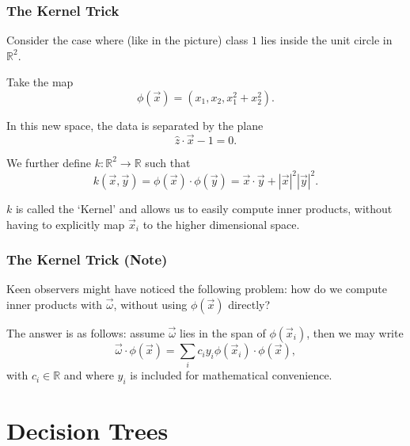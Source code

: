 \documentclass[mathserif,serif]{beamer}
\begin{document}
\begin{frame}
  \frametitle{The Kernel Trick}
  Consider the case where (like in the picture) class $1$ lies inside the unit circle in $\mathbb{R}^2$.

  \pause
  Take the map
  \begin{equation}
    \phi(\vec x) = (x_1, x_2, x_1^2+x_2^2).
  \end{equation}

  \pause
  In this new space, the data is separated by the plane
  \begin{equation}
    \hat z \cdot \vec x - 1 = 0.
  \end{equation}

  \pause
  We further define $k: \mathbb{R}^2 \to \mathbb{R}$ such that
  \begin{equation}
    k(\vec x, \vec y) = \phi(\vec x) \cdot \phi(\vec y) = \vec x \cdot \vec y + |\vec x|^2 |\vec y|^2.
  \end{equation}

  \pause
  $k$ is called the `Kernel' and allows us to easily compute inner products, without having to
  explicitly map $\vec x_i$ to the higher dimensional space.

\end{frame}

\begin{frame}
  \frametitle{The Kernel Trick (Note)}

  Keen observers might have noticed the following problem: how do we compute inner products with
  $\vec\omega$, without using $\phi(\vec x)$ directly?

  \pause
  The answer is as follows: assume $\vec\omega$ lies in the span of $\phi(\vec x_i)$, then we may
  write
  \begin{equation}
    \vec\omega \cdot \phi(\vec x) = \sum_i c_i y_i \phi(\vec x_i) \cdot \phi(\vec x),
  \end{equation}
  with $c_i \in \mathbb{R}$ and where $y_i$ is included for mathematical convenience.
\end{frame}

\section{Decision Trees}
\frame{\sectionpage}
\end{document}
